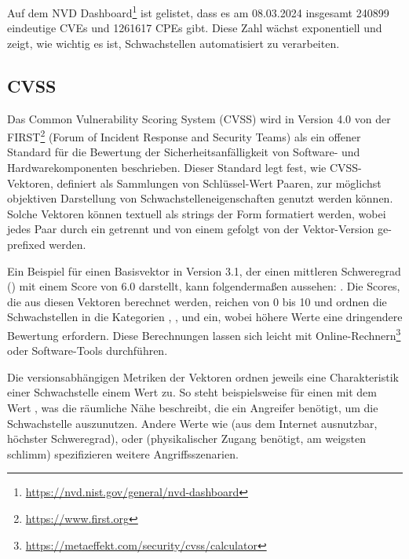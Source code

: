 \newline{}

Auf dem NVD Dashboard\footnote{\url{https://nvd.nist.gov/general/nvd-dashboard}} ist gelistet, dass es am 08.03.2024 insgesamt 240899 eindeutige CVEs und 1261617 CPEs gibt.
Diese Zahl wächst exponentiell und zeigt, wie wichtig es ist, Schwachstellen automatisiert zu verarbeiten.

\subsection{CVSS} \label{subsec:projektbericht-grundlagen-cvss}

Das Common Vulnerability Scoring System (CVSS) wird in Version 4.0 \cite{CVSSv4.0Specification} von der FIRST\footnote{\url{https://www.first.org}} (Forum of Incident Response and Security Teams) als ein offener Standard für die Bewertung der Sicherheitsanfälligkeit von Software- und Hardwarekomponenten beschrieben.
Dieser Standard legt fest, wie CVSS-Vektoren, definiert als Sammlungen von Schlüssel-Wert Paaren, zur möglichst objektiven Darstellung von Schwachstelleneigenschaften genutzt werden können.
Solche Vektoren können textuell als strings der Form  formatiert werden, wobei jedes Paar durch ein \qt{/} getrennt und von einem  gefolgt von der Vektor-Version ge-prefixed werden.

Ein Beispiel für einen Basisvektor in Version 3.1, der einen mittleren Schweregrad () mit einem Score von 6.0 darstellt, kann folgendermaßen aussehen: .
Die Scores, die aus diesen Vektoren berechnet werden, reichen von 0 bis 10 und ordnen die Schwachstellen in die Kategorien , ,  und  ein, wobei höhere Werte eine dringendere Bewertung erfordern.
Diese Berechnungen lassen sich leicht mit Online-Rechnern\footnote{\url{https://metaeffekt.com/security/cvss/calculator}} oder Software-Tools durchführen.

Die versionsabhängigen Metriken der Vektoren ordnen jeweils eine Charakteristik einer Schwachstelle einem Wert zu.
So steht beispielsweise  für einen  mit dem Wert , was die räumliche Nähe beschreibt, die ein Angreifer benötigt, um die Schwachstelle auszunutzen.
Andere Werte wie  (aus dem Internet ausnutzbar, höchster Schweregrad),  oder  (physikalischer Zugang benötigt, am weigsten schlimm) spezifizieren weitere Angriffsszenarien.

